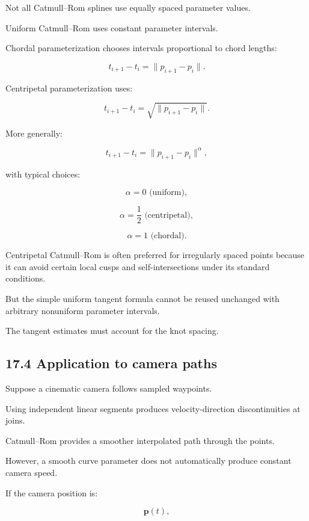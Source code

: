 \hypertarget{02-foundations-ii-ch028-uniform-chordal-and-centripetal-parameterizations}{}

Not all Catmull--Rom splines use equally spaced parameter values.

Uniform Catmull--Rom uses constant parameter intervals.

Chordal parameterization chooses intervals proportional to chord lengths:

\[ t_{i+1}-t_i=\|p_{i+1}-p_i\|. \]

Centripetal parameterization uses:

\[ \boxed{ t_{i+1}-t_i=\sqrt{\|p_{i+1}-p_i\|} }. \]

More generally:

\[ t_{i+1}-t_i= \|p_{i+1}-p_i\|^\alpha, \]

with typical choices:

\[ \alpha=0 \text{ (uniform)}, \]

\[ \alpha=\frac12 \text{ (centripetal)}, \]

\[ \alpha=1 \text{ (chordal)}. \]

Centripetal Catmull--Rom is often preferred for irregularly spaced points because it can avoid certain local cusps and self-intersections under its standard conditions.

But the simple uniform tangent formula cannot be reused unchanged with arbitrary nonuniform parameter intervals.

The tangent estimates must account for the knot spacing.

\subsection{17.4 Application to camera paths}\label{02-foundations-ii-ch028-application-to-camera-paths}

\hypertarget{02-foundations-ii-ch028-application-to-camera-paths}{}

Suppose a cinematic camera follows sampled waypoints.

Using independent linear segments produces velocity-direction discontinuities at joins.

Catmull--Rom provides a smoother interpolated path through the points.

However, a smooth curve parameter does not automatically produce constant camera speed.

If the camera position is:

\[ \mathbf p(t), \]

